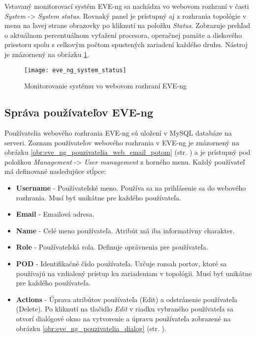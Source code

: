 Vstavaný monitorovací systém EVE-ng sa nachádza vo webovom rozhraní v časti \emph{System} -> \emph{System status}. Rovnaký panel je prístupný aj z rozhrania topológie v menu na ľavej strane obrazovky po kliknutí na položku \emph{Status}. Zobrazuje prehľad o aktuálnom percentuálnom vyťažení procesora, operačnej pamäte a diskového priestoru spolu s celkovým počtom spustených zariadení každého druhu. Nástroj je znázornený na obrázku \ref{obr:eve_ng_system_status}.

\begin{figure}
    \centering
    \texttt{[image: eve\_ng\_system\_status]}
    \caption{Monitorovanie systému vo webovom rozhraní EVE-ng}
    \label{obr:eve_ng_system_status}
\end{figure}





\subsection{Správa používateľov EVE-ng}
\label{chap:sprava_pouzivatelov}

Používatelia webového rozhrania EVE-ng sú uložení v MySQL databáze na serveri. Zoznam používateľov webového rozhrania v EVE-ng je znázornený na obrázku \ref{obr:eve_ng_pouzivatelia_web_email_potom} (str. \pageref{obr:eve_ng_pouzivatelia_web_email_potom}) a je prístupný pod položkou \emph{Management} -> \emph{User management} z horného menu. Každý používateľ má definované nasledujúce stĺpce:

\begin{itemize}[noitemsep]
    \item \textbf{Username} - Používateľské meno. Používa sa na prihlásenie sa do webového rozhrania. Musí byť unikátne pre každého používateľa.
    \item \textbf{Email} - Emailová adresa.
    \item \textbf{Name} - Celé meno používateľa. Atribút má iba informatívny charakter.
    \item \textbf{Role} - Používateľská rola. Definuje oprávnenia pre používateľa.
    \item \textbf{POD} - Identifikačné číslo používateľa. Určuje rozsah portov, ktoré sa používajú na vzdialený prístup ku zariadeniam v topológii. Musí byť unikátne pre každého používateľa.
    \item \textbf{Actions} - Úprava atribútov používateľa (Edit) a odstránenie používateľa (Delete). Po kliknutí na tlačidlo \emph{Edit} v riadku vybraného používateľa sa otvorí dialógové okno na vytvorenie a úpravu používateľa zobrazené na obrázku \ref{obr:eve_ng_pouzivatelia_dialog} (str. \pageref{obr:eve_ng_pouzivatelia_dialog}).
\end{itemize}

